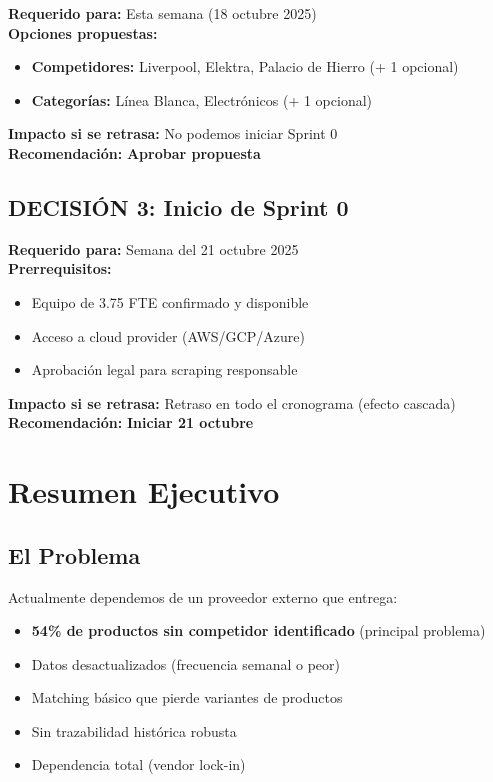 \documentclass[12pt,a4paper]{article}
\begin{document}
\begin{tcolorbox}[colback=lightgray, colframe=black]
\textbf{Requerido para:} Esta semana (18 octubre 2025)\\
\textbf{Opciones propuestas:}
\begin{itemize}[leftmargin=*]
    \item \textbf{Competidores:} Liverpool, Elektra, Palacio de Hierro (+ 1 opcional)
    \item \textbf{Categorías:} Línea Blanca, Electrónicos (+ 1 opcional)
\end{itemize}
\textbf{Impacto si se retrasa:} No podemos iniciar Sprint 0\\
\textbf{Recomendación:} \textcolor{successgreen}{\textbf{Aprobar propuesta}}
\end{tcolorbox}

\subsection*{DECISIÓN 3: Inicio de Sprint 0}

\begin{tcolorbox}[colback=lightgray, colframe=black]
\textbf{Requerido para:} Semana del 21 octubre 2025\\
\textbf{Prerrequisitos:}
\begin{itemize}[leftmargin=*]
    \item Equipo de 3.75 FTE confirmado y disponible
    \item Acceso a cloud provider (AWS/GCP/Azure)
    \item Aprobación legal para scraping responsable
\end{itemize}
\textbf{Impacto si se retrasa:} Retraso en todo el cronograma (efecto cascada)\\
\textbf{Recomendación:} \textcolor{successgreen}{\textbf{Iniciar 21 octubre}}
\end{tcolorbox}

\newpage
\section{Resumen Ejecutivo}

\subsection{El Problema}

Actualmente dependemos de un proveedor externo que entrega:
\begin{itemize}[leftmargin=*]
    \item \textcolor{dangerred}{\textbf{54\% de productos sin competidor identificado}} (principal problema)
    \item Datos desactualizados (frecuencia semanal o peor)
    \item Matching básico que pierde variantes de productos
    \item Sin trazabilidad histórica robusta
    \item Dependencia total (vendor lock-in)
\end{itemize}
\end{document}
